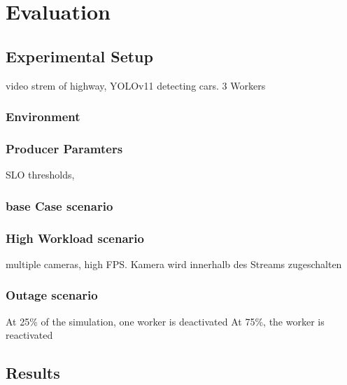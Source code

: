 \chapter{Evaluation}
\section{Experimental Setup}
video strem of highway, YOLOv11 detecting cars. 3 Workers

\subsection{Environment}
\subsection{Producer Paramters}
SLO thresholds, 
\subsection{base Case scenario}
\subsection{High Workload scenario}
multiple cameras, high FPS.
Kamera wird innerhalb des Streams zugeschalten
\subsection{Outage scenario}
At 25\% of the simulation, one worker is deactivated
At 75\%, the worker is reactivated

\section{Results}